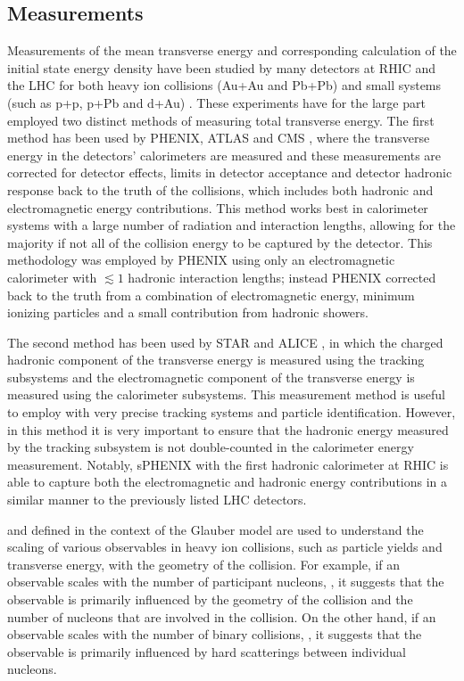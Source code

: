 \subsection{\detdeta Measurements}

Measurements of the mean transverse energy and corresponding calculation of the initial state energy density have been studied by many detectors at RHIC and the LHC for both heavy ion collisions (Au+Au and Pb+Pb) and small systems (such as p+p, p+Pb and d+Au) \cite{PHENIX_detdeta,STAR_detdeta,cms_pbpb_detdeta,alice_detdeta,cms_pPb_detdeta,atlas_detdeta}. 
These experiments have for the large part employed two distinct methods of measuring total transverse energy.
The first method has been used by PHENIX, ATLAS and CMS \cite{PHENIX_detdeta,cms_pbpb_detdeta,atlas_detdeta}, where the transverse energy in the detectors' calorimeters are measured and these measurements are corrected for detector effects, limits in detector acceptance and detector hadronic response back to the truth \detdeta of the collisions, which includes both hadronic and electromagnetic energy contributions. 
This method works best in calorimeter systems with a large number of radiation and interaction lengths, allowing for the majority if not all of the collision energy to be captured by the detector. 
This methodology was employed by PHENIX \cite{PHENIX_detdeta} using only an electromagnetic calorimeter with $\lesssim 1$ hadronic interaction lengths; instead PHENIX corrected back to the truth \detdeta from a combination of electromagnetic energy, minimum ionizing particles and a small contribution from hadronic showers. 

The second method has been used by STAR and ALICE \cite{STAR_detdeta,alice_detdeta}, in which the charged hadronic component of the transverse energy is measured using the tracking subsystems and the electromagnetic component of the transverse energy is measured using the calorimeter subsystems. 
This measurement method is useful to employ with very precise tracking systems and particle identification. However, in this method it is very important to ensure that the hadronic energy measured by the tracking subsystem is not double-counted in the calorimeter energy measurement. 
Notably, sPHENIX with the first hadronic calorimeter at RHIC is able to capture both the electromagnetic and hadronic energy contributions in a similar manner to the previously listed LHC detectors. 

\Npart and \Ncoll defined in the context of the Glauber model are used to understand the scaling of various observables in heavy ion collisions, such as particle yields and transverse energy, with the geometry of the collision. 
For example, if an observable scales with the number of participant nucleons, \Npart, it suggests that the observable is primarily influenced by the geometry of the collision and the number of nucleons that are involved in the collision. 
On the other hand, if an observable scales with the number of binary collisions, \Ncoll, it suggests that the observable is primarily influenced by hard scatterings between individual nucleons. 

